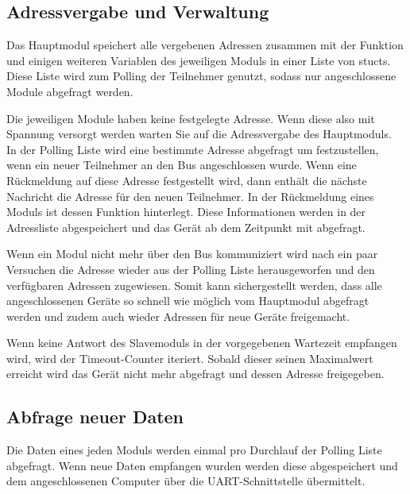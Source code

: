 \subsection{Adressvergabe und Verwaltung}
\textmd{Das Hauptmodul speichert alle vergebenen Adressen zusammen mit der Funktion und einigen weiteren Variablen des jeweiligen Moduls in einer Liste von stucts.\\
Diese Liste wird zum Polling der Teilnehmer genutzt, sodass nur angeschlossene Module abgefragt werden.\\}





\textmd{Die jeweiligen Module haben keine festgelegte Adresse. Wenn diese also mit Spannung versorgt werden warten Sie auf die Adressvergabe des Hauptmoduls.\\
In der Polling Liste wird eine bestimmte Adresse abgefragt um festzustellen, wenn ein neuer Teilnehmer an den Bus angeschlossen wurde. Wenn eine Rückmeldung auf diese Adresse festgestellt wird, dann enthält die nächste Nachricht die Adresse für den neuen Teilnehmer.
In der Rückmeldung eines Moduls ist dessen Funktion hinterlegt. Diese Informationen werden in der Adressliste abgespeichert und das Gerät ab dem Zeitpunkt mit abgefragt.\\
}

\newpage


\textmd{Wenn ein Modul nicht mehr über den Bus kommuniziert wird nach ein paar Versuchen die Adresse wieder aus der Polling Liste herausgeworfen und den verfügbaren Adressen zugewiesen. Somit kann sichergestellt werden, dass alle angeschlossenen Geräte so schnell wie möglich vom Hauptmodul abgefragt werden und zudem auch wieder Adressen für neue Geräte freigemacht.
}



\textmd{Wenn keine Antwort des Slavemoduls in der vorgegebenen Wartezeit empfangen wird, wird der Timeout-Counter iteriert. Sobald dieser seinen Maximalwert erreicht wird das Gerät nicht mehr abgefragt und dessen Adresse freigegeben.
}

\newpage
\subsection{Abfrage neuer Daten}
\textmd{Die Daten eines jeden Moduls werden einmal pro Durchlauf der Polling Liste abgefragt. Wenn neue Daten empfangen wurden werden diese abgespeichert und dem angeschlossenen Computer über die UART-Schnittstelle übermittelt.
}

